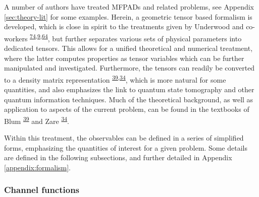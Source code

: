 \documentclass[10pt]{article}
\begin{document}
A number of authors have treated MFPADs and related problems, see Appendix \ref{sec:theory-lit} for some examples. Herein, a geometric tensor based formalism is developed, which is close in spirit to the treatments given by Underwood and co-workers \textsuperscript{\hyperref[csl:74]{74},\hyperref[csl:9]{9},\hyperref[csl:64]{64}}, but further separates various sets of physical parameters into dedicated tensors. This allows for a unified theoretical and numerical treatment, where the latter computes properties as tensor variables which can be further manipulated and investigated. %
Furthermore, the tensors can readily be converted to a density matrix representation \textsuperscript{\hyperref[csl:39]{39},\hyperref[csl:34]{34}}, which is more natural for some quantities, and also emphasizes the link to quantum state tomography and other quantum information techniques. Much of the theoretical background, as well as application to aspects of the current problem, can be found in the textbooks of Blum \textsuperscript{\hyperref[csl:39]{39}} and Zare \textsuperscript{\hyperref[csl:34]{34}}.

Within this treatment, the observables can be defined in a series of simplified forms, emphasizing the quantities of interest for a given problem. Some details are defined in the following subsections, and further detailed in Appendix \ref{appendix:formalism}.


\subsubsection{Channel functions\label{sec:channel-funcs}}
\end{document}
